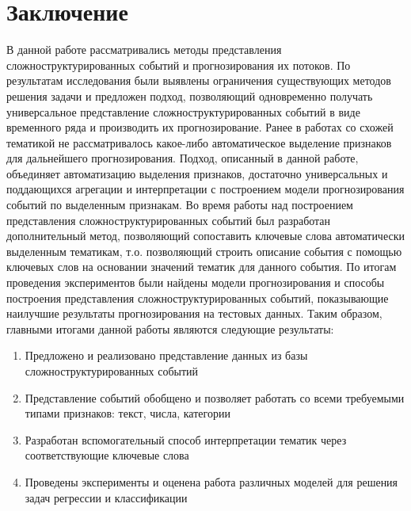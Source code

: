 \section{Заключение}
В данной работе рассматривались методы представления сложноструктурированных событий и прогнозирования их потоков. По результатам исследования были выявлены ограничения существующих методов решения задачи и предложен подход, позволяющий одновременно получать универсальное представление сложноструктурированных событий в виде временного ряда и производить их прогнозирование.
Ранее в работах со схожей тематикой не рассматривалось какое-либо автоматическое выделение признаков для дальнейшего прогнозирования. Подход, описанный в данной работе, объединяет автоматизацию выделения признаков, достаточно универсальных и поддающихся агрегации и интерпретации с построением модели прогнозирования событий по выделенным признакам.
Во время работы над построением представления сложноструктурированных событий был разработан дополнительный метод, позволяющий сопоставить ключевые слова автоматически выделенным тематикам, т.о. позволяющий строить описание события с помощью ключевых слов на основании значений тематик для данного события.
По итогам проведения экспериментов были найдены модели прогнозирования и способы построения представления сложноструктурированных событий, показывающие наилучшие результаты прогнозирования на тестовых данных.
Таким образом, главными итогами данной  работы являются следующие результаты:
\begin{enumerate}
    \item Предложено и реализовано представление данных из базы сложноструктурированных событий
    \item Представление событий обобщено и позволяет работать со всеми требуемыми типами признаков: текст, числа, категории
    \item Разработан вспомогательный способ интерпретации тематик через соответствующие ключевые слова
    \item Проведены эксперименты и оценена работа различных моделей для решения задач регрессии и классификации

\end{enumerate}